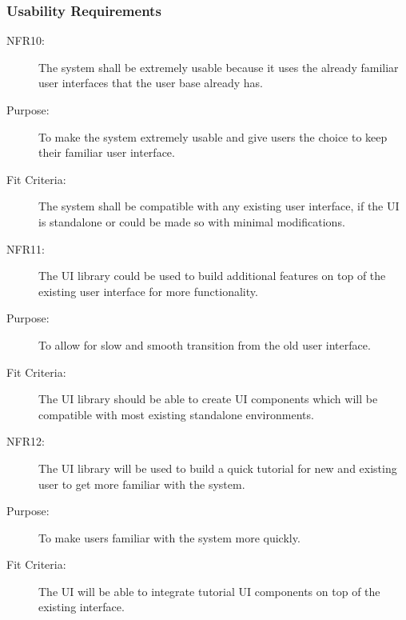 \documentclass[a4paper,twoside,phd]{BYUPhys}
\begin{document}
\subsubsection{Usability Requirements}
\begin{description}
\item[NFR10:] The system shall be extremely usable because it uses the already familiar user interfaces that the user base already has.
\item[Purpose:] To make the system extremely usable and give users the choice to keep their familiar user interface.
\item[Fit Criteria:] The system shall be compatible with any existing user interface, if the UI is standalone or could be made so with minimal modifications.
\item[NFR11:] The UI library could be used to build additional features on top of the existing user interface for more functionality.
\item[Purpose:] To allow for slow and smooth transition from the old user interface.
\item[Fit Criteria:] The UI library should be able to create UI components which will be compatible with most existing standalone environments.
\item[NFR12:] The UI library will be used to build a quick tutorial for new and existing user to get more familiar with the system.
\item[Purpose:] To make users familiar with the system more quickly.
\item[Fit Criteria:] The UI will be able to integrate tutorial UI components on top of the existing interface.
\end{description}
\end{document}
